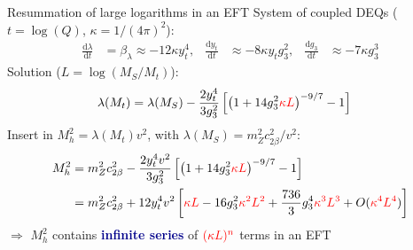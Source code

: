\documentclass[hyperref={pdfpagelabels=false},ngerman]{beamer}
\newcommand{\MS}{\ensuremath{M_S}}
\renewcommand{\emph}[1]{\textbf{\textcolor{darkblue}{#1}}}
\newcommand{\dd}{\text{d}}
\begin{document}
\begin{frame}{Resummation of large logarithms in an EFT}
  System of coupled DEQs ($t = \log(Q)$, $\kappa = 1/(4\pi)^2$):
  \begin{align*}
    \frac{\dd\lambda}{\dd t} &= \beta_\lambda \approx -12 \kappa y_t^4 , &
    \frac{\dd y_t}{\dd t} &\approx -8 \kappa y_t g_3^2 , &
    \frac{\dd g_3}{\dd t} &\approx -7 \kappa g_3^3
  \end{align*}
  Solution ($L = \log(\MS/M_t)$):
  \begin{align*}
    \lambda(M_t) &= %
                   \lambda(\MS)
                   - \frac{2 y_t^4}{3 g_3^2} \left[
                   \left( 1 + 14 g_3^2 \textcolor{red}{\kappa L} \right)^{-9/7} - 1
    \right]
  \end{align*}
  Insert in $M_h^2 = \lambda(M_t) v^2$,
  with $\lambda(\MS) = m_Z^2 c^2_{2\beta}/v^2$:
  \begin{align*}
    M_h^2 &= m_Z^2 c^2_{2\beta}
            - \frac{2 y_t^4 v^2}{3 g_3^2} \left[
            \left( 1 + 14 g_3^2 \textcolor{red}{\kappa L} \right)^{-9/7} - 1
            \right]\\
          &= m_Z^2 c^2_{2\beta}
            + 12 y_t^4 v^2 \left[
            \textcolor{red}{\kappa L}
            - 16 g_3^2 \textcolor{red}{\kappa^2 L^2}
            + \frac{736}{3} g_3^4 \textcolor{red}{\kappa^3 L^3} + O(\textcolor{red}{\kappa^4L^4})
            \right]
  \end{align*}
  $\Rightarrow$ $M_h^2$ contains \emph{infinite series} of $\textcolor{red}{(\kappa L)^n}$ terms in an EFT
\end{frame}
\end{document}
